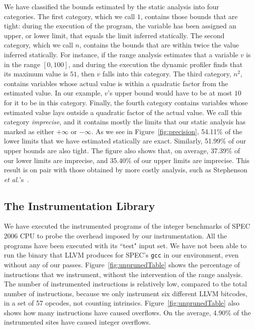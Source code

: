 \documentclass[preprint]{sigplanconf}[10pt]
\begin{document}
We have classified the bounds estimated by the static analysis into four
categories.
The first category, which we call $1$, contains those bounds that are tight:
during the execution of the program, the variable has been assigned an upper,
or lower limit, that equals the limit inferred statically.
The second category, which we call $n$, contains the bounds that are
within twice the value inferred statically.
For instance, if the range analysis estimates that a variable $v$ is in the
range $[0, 100]$, and during the execution the dynamic profiler finds that
its maximum value is $51$, then $v$ falls into this category.
The third category, $n^2$, contains variables whose actual value is within
a quadratic factor from the estimated value.
In our example, $v$'s upper bound would have to be at most $10$ for it to
be in this category.
Finally, the fourth category contains variables whose estimated value lays
outside a quadratic factor of the actual value.
We call this category {\em imprecise}, and it contains mostly the limits that
our static analysis has marked as either $+\infty$ or $-\infty$.
As we see in Figure~\ref{fig:precision}, 54.11\% of the lower limits that
we have estimated statically are exact.
Similarly, 51.99\% of our upper bounds are also tight.
The figure also shows that, on average, 37.39\% of our lower limits are
imprecise, and 35.40\% of our upper limits are imprecise.
This result is on pair with those obtained by more costly analysis, such as
Stephenson {\em et al.}'s~\cite{Stephenson00}.




\subsection{The Instrumentation Library}
\label{sub:inst}

We have executed the instrumented programs of the integer benchmarks of SPEC
2006 CPU to probe the overhead imposed by our instrumentation.
All the programs have been executed with its ``test" input set.
We have not been able to run the binary that LLVM produces for SPEC's
\texttt{gcc} in our environment, even without any of our passes.
Figure~\ref{fig:unprunedTable} shows the percentage of instructions that
we instrument, without the intervention of the range analysis.
The number of instrumented instructions is relatively low, compared to the
total number of instructions, because we only instrument six different
LLVM bitcodes, in a set of 57 opcodes, not counting intrinsics.
Figure~\ref{fig:unprunedTable} also shows how many instructions have caused
overflows.
On the average, 4.90\% of the instrumented sites have caused integer overflows.
\end{document}
